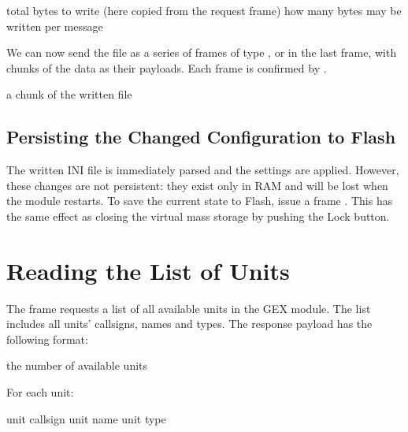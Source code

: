 \begin{boxedpayload}
	 total bytes to write (here copied from the request frame)
	 how many bytes may be written per message
\end{boxedpayload}

We can now send the file as a series of frames of type \CmdBulkData, or \CmdBulkEnd in the last frame, with chunks of the data as their payloads. Each frame is confirmed by \CmdSuccess.

\begin{boxedpayload}
	 a chunk of the written file
\end{boxedpayload}

\subsection{Persisting the Changed Configuration to Flash}

The written INI file is immediately parsed and the settings are applied. However, these changes are not persistent: they exist only in \gls{RAM} and will be lost when the module restarts. To save the current state to Flash, issue a frame \CmdPersistConfig. This has the same effect as closing the virtual mass storage by pushing the Lock button.

\section{Reading the List of Units}

The frame \CmdListUnits requests a list of all available units in the GEX module. The list includes all units' callsigns, names and types. The response payload has the following format:

\begin{boxedpayload}
	 the number of available units
	\item For each unit:
		\begin{pldlist}
			 unit callsign
			 unit name
			 unit type
		\end{pldlist}
\end{boxedpayload}



